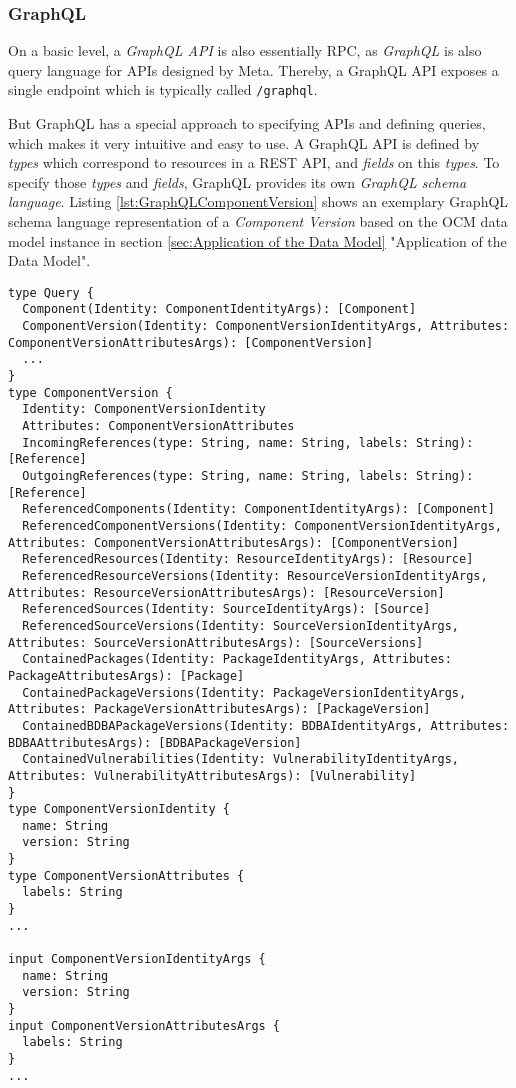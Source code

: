\subsubsection{GraphQL}
On a basic level, a \emph{GraphQL API} is also essentially RPC, as \emph{GraphQL} is also query language for APIs \cite{GraphQL} designed by Meta. Thereby, a GraphQL API exposes a single endpoint which is typically called \lstinline|/graphql|.\par
But GraphQL has a special approach to specifying APIs and defining queries, which makes it very intuitive and easy to use. A GraphQL API is defined by \emph{types} which correspond to resources in a REST API, and \emph{fields} on this \emph{types}. To specify those \emph{types} and \emph{fields}, GraphQL provides its own \emph{GraphQL schema language}. Listing \ref{lst:GraphQLComponentVersion} shows an exemplary GraphQL schema language representation of a \emph{Component Version} based on the OCM data model instance in section \ref{sec:Application of the Data Model} "Application of the Data Model".

\begin{lstlisting}[basicstyle=\tiny, caption=GraphQL Component Version Schema, captionpos=b, label=lst:GraphQLComponentVersion]
type Query {
  Component(Identity: ComponentIdentityArgs): [Component]
  ComponentVersion(Identity: ComponentVersionIdentityArgs, Attributes: ComponentVersionAttributesArgs): [ComponentVersion]
  ...
}
type ComponentVersion {
  Identity: ComponentVersionIdentity
  Attributes: ComponentVersionAttributes
  IncomingReferences(type: String, name: String, labels: String): [Reference]
  OutgoingReferences(type: String, name: String, labels: String): [Reference]
  ReferencedComponents(Identity: ComponentIdentityArgs): [Component]
  ReferencedComponentVersions(Identity: ComponentVersionIdentityArgs, Attributes: ComponentVersionAttributesArgs): [ComponentVersion]
  ReferencedResources(Identity: ResourceIdentityArgs): [Resource]
  ReferencedResourceVersions(Identity: ResourceVersionIdentityArgs, Attributes: ResourceVersionAttributesArgs): [ResourceVersion]
  ReferencedSources(Identity: SourceIdentityArgs): [Source]
  ReferencedSourceVersions(Identity: SourceVersionIdentityArgs, Attributes: SourceVersionAttributesArgs): [SourceVersions]
  ContainedPackages(Identity: PackageIdentityArgs, Attributes: PackageAttributesArgs): [Package]
  ContainedPackageVersions(Identity: PackageVersionIdentityArgs, Attributes: PackageVersionAttributesArgs): [PackageVersion]
  ContainedBDBAPackageVersions(Identity: BDBAIdentityArgs, Attributes: BDBAAttributesArgs): [BDBAPackageVersion]
  ContainedVulnerabilities(Identity: VulnerabilityIdentityArgs, Attributes: VulnerabilityAttributesArgs): [Vulnerability]
}
type ComponentVersionIdentity {
  name: String
  version: String
}
type ComponentVersionAttributes {
  labels: String
}
...

input ComponentVersionIdentityArgs {
  name: String
  version: String
}
input ComponentVersionAttributesArgs {
  labels: String
}
...
\end{lstlisting}

